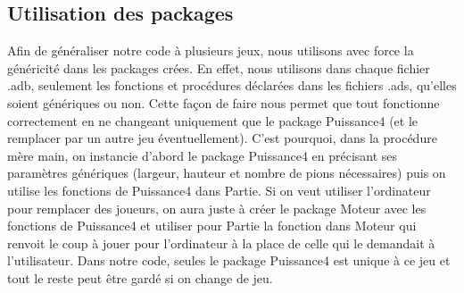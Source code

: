 \documentclass[a4paper, 10pt, french]{article}
\begin{document}
{    \subsection{Utilisation des packages}
    {
        Afin de généraliser notre code à plusieurs jeux, nous utilisons avec force la généricité dans les packages crées.
        En effet, nous utilisons dans chaque fichier .adb, seulement les fonctions et procédures déclarées dans les fichiers
        .ads, qu'elles soient génériques ou non. Cette façon de faire nous permet que tout fonctionne correctement en ne changeant
        uniquement que le package Puissance4 (et le remplacer par un autre jeu éventuellement).
        C'est pourquoi, dans la procédure mère main, on instancie d'abord le package Puissance4 en précisant ses paramètres
        génériques (largeur, hauteur et nombre de pions nécessaires) puis on utilise les fonctions de Puissance4 dans Partie.
        Si on veut utiliser l'ordinateur pour remplacer des joueurs, on aura juste à créer le package Moteur avec les fonctions
        de Puissance4 et utiliser pour Partie la fonction dans Moteur qui renvoit le coup à jouer pour l'ordinateur à la place de
        celle qui le demandait à l'utilisateur.
        Dans notre code, seules le package Puissance4 est unique à ce jeu et tout le reste peut être gardé si on change de jeu.
    }
} 

\end{document}
